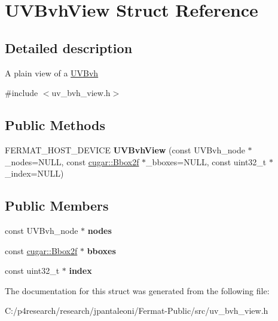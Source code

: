 \hypertarget{struct_u_v_bvh_view}{}\section{U\+V\+Bvh\+View Struct Reference}
\label{struct_u_v_bvh_view}


\subsection{Detailed description}
A plain view of a \hyperlink{struct_u_v_bvh}{U\+V\+Bvh} 

{\ttfamily \#include $<$uv\+\_\+bvh\+\_\+view.\+h$>$}

\subsection*{Public Methods}
\begin{DoxyCompactItemize}
\item 
\mbox{\label{struct_u_v_bvh_view_ab864abe02ed1727a65b4796a9da890cc}} 
F\+E\+R\+M\+A\+T\+\_\+\+H\+O\+S\+T\+\_\+\+D\+E\+V\+I\+CE {\bfseries U\+V\+Bvh\+View} (const U\+V\+Bvh\+\_\+node $\ast$\+\_\+nodes=N\+U\+LL, const \hyperlink{structcugar_1_1_bbox}{cugar\+::\+Bbox2f} $\ast$\+\_\+bboxes=N\+U\+LL, const uint32\+\_\+t $\ast$\+\_\+index=N\+U\+LL)
\end{DoxyCompactItemize}
\subsection*{Public Members}
\begin{DoxyCompactItemize}
\item 
\mbox{\label{struct_u_v_bvh_view_a38d532b0c38fb5f4e9d7bfa2b3623425}} 
const U\+V\+Bvh\+\_\+node $\ast$ {\bfseries nodes}
\item 
\mbox{\label{struct_u_v_bvh_view_a1c03e16510f7c44809fc8dedae1250fe}} 
const \hyperlink{structcugar_1_1_bbox}{cugar\+::\+Bbox2f} $\ast$ {\bfseries bboxes}
\item 
\mbox{\label{struct_u_v_bvh_view_a2c4b7c7138ae97bb85f62f66b1e806de}} 
const uint32\+\_\+t $\ast$ {\bfseries index}
\end{DoxyCompactItemize}


The documentation for this struct was generated from the following file\+:\begin{DoxyCompactItemize}
\item 
C\+:/p4research/research/jpantaleoni/\+Fermat-\/\+Public/src/uv\+\_\+bvh\+\_\+view.\+h\end{DoxyCompactItemize}
